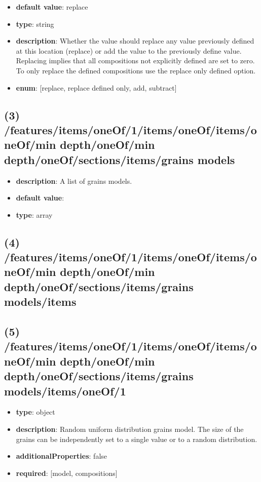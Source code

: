 \begin{itemize}[leftmargin=6em]\item {\bf default value}: replace
\item {\bf type}: string
\item {\bf description}: Whether the value should replace any value previously defined at this location (replace) or add the value to the previously define value. Replacing implies that all compositions not explicitly defined are set to zero. To only replace the defined compositions use the replace only defined option.
\item {\bf enum}: [replace, replace defined only, add, subtract]\end{itemize}\subsection{(3) /features/items/oneOf/1/items/oneOf/items/oneOf/min depth/oneOf/min depth/oneOf/sections/items/grains models}
\begin{itemize}[leftmargin=3em]\item {\bf description}: A list of grains models.
\item {\bf default value}: 
\item {\bf type}: array
\end{itemize}\subsection{(4) /features/items/oneOf/1/items/oneOf/items/oneOf/min depth/oneOf/min depth/oneOf/sections/items/grains models/items}

\subsection{(5) /features/items/oneOf/1/items/oneOf/items/oneOf/min depth/oneOf/min depth/oneOf/sections/items/grains models/items/oneOf/1}
\begin{itemize}[leftmargin=5em]\item {\bf type}: object
\item {\bf description}: Random uniform distribution grains model. The size of the grains can be independently set to a single value or to a random distribution.
\item {\bf additionalProperties}: false
\item {\bf required}: [model, compositions]\end{itemize}

